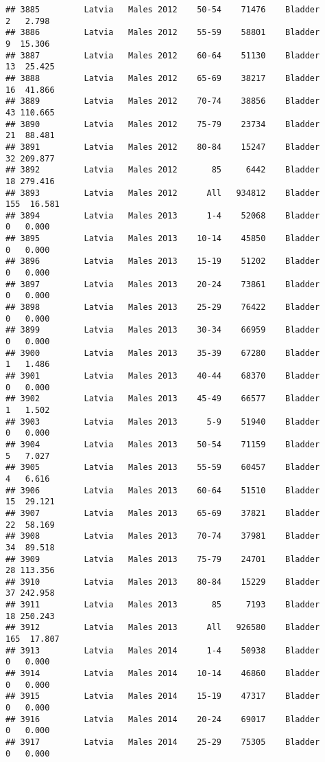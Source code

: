 \documentclass[
]{article}
\begin{document}
\begin{verbatim}
## 3885         Latvia   Males 2012    50-54    71476    Bladder      2   2.798
## 3886         Latvia   Males 2012    55-59    58801    Bladder      9  15.306
## 3887         Latvia   Males 2012    60-64    51130    Bladder     13  25.425
## 3888         Latvia   Males 2012    65-69    38217    Bladder     16  41.866
## 3889         Latvia   Males 2012    70-74    38856    Bladder     43 110.665
## 3890         Latvia   Males 2012    75-79    23734    Bladder     21  88.481
## 3891         Latvia   Males 2012    80-84    15247    Bladder     32 209.877
## 3892         Latvia   Males 2012       85     6442    Bladder     18 279.416
## 3893         Latvia   Males 2012      All   934812    Bladder    155  16.581
## 3894         Latvia   Males 2013      1-4    52068    Bladder      0   0.000
## 3895         Latvia   Males 2013    10-14    45850    Bladder      0   0.000
## 3896         Latvia   Males 2013    15-19    51202    Bladder      0   0.000
## 3897         Latvia   Males 2013    20-24    73861    Bladder      0   0.000
## 3898         Latvia   Males 2013    25-29    76422    Bladder      0   0.000
## 3899         Latvia   Males 2013    30-34    66959    Bladder      0   0.000
## 3900         Latvia   Males 2013    35-39    67280    Bladder      1   1.486
## 3901         Latvia   Males 2013    40-44    68370    Bladder      0   0.000
## 3902         Latvia   Males 2013    45-49    66577    Bladder      1   1.502
## 3903         Latvia   Males 2013      5-9    51940    Bladder      0   0.000
## 3904         Latvia   Males 2013    50-54    71159    Bladder      5   7.027
## 3905         Latvia   Males 2013    55-59    60457    Bladder      4   6.616
## 3906         Latvia   Males 2013    60-64    51510    Bladder     15  29.121
## 3907         Latvia   Males 2013    65-69    37821    Bladder     22  58.169
## 3908         Latvia   Males 2013    70-74    37981    Bladder     34  89.518
## 3909         Latvia   Males 2013    75-79    24701    Bladder     28 113.356
## 3910         Latvia   Males 2013    80-84    15229    Bladder     37 242.958
## 3911         Latvia   Males 2013       85     7193    Bladder     18 250.243
## 3912         Latvia   Males 2013      All   926580    Bladder    165  17.807
## 3913         Latvia   Males 2014      1-4    50938    Bladder      0   0.000
## 3914         Latvia   Males 2014    10-14    46860    Bladder      0   0.000
## 3915         Latvia   Males 2014    15-19    47317    Bladder      0   0.000
## 3916         Latvia   Males 2014    20-24    69017    Bladder      0   0.000
## 3917         Latvia   Males 2014    25-29    75305    Bladder      0   0.000

\end{verbatim}
\end{document}

